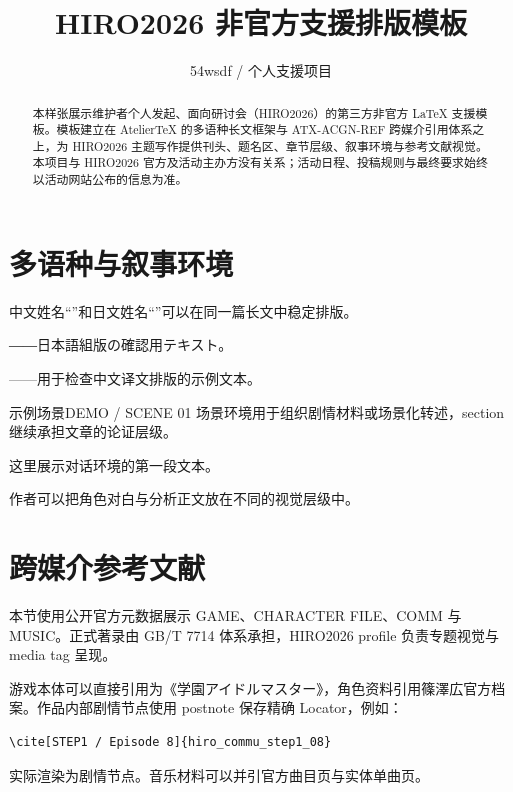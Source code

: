 \documentclass[titlelayout=\HIRODemoTitleLayout]{hiro2026}
\title{HIRO2026 非官方支援排版模板}
\author{54wsdf / 个人支援项目}
\begin{document}
\maketitle

\begin{abstract}
本样张展示维护者个人发起、面向\HiroNameHans{}研讨会（HIRO2026）的第三方非官方 LaTeX 支援模板。模板建立在 AtelierTeX 的多语种长文框架与 ATX-ACGN-REF 跨媒介引用体系之上，为 HIRO2026 主题写作提供刊头、题名区、章节层级、叙事环境与参考文献视觉。本项目与 HIRO2026 官方及活动主办方没有关系；活动日程、投稿规则与最终要求始终以活动网站公布的信息为准。
\end{abstract}

\clearpage

\section{多语种与叙事环境}
中文姓名“\HiroNameHans{}”和日文姓名“\HiroNameJapanese{}”可以在同一篇长文中稳定排版。

\begin{HiroOriginal}[ja]
\HiroNameJapanese{}――日本語組版の確認用テキスト。
\end{HiroOriginal}

\begin{HiroTranslation}
\HiroNameHans{}——用于检查中文译文排版的示例文本。
\end{HiroTranslation}

\begin{HiroScene}{示例场景}{DEMO / SCENE 01}
场景环境用于组织剧情材料或场景化转述，section 继续承担文章的论证层级。
\end{HiroScene}

\begin{HiroDialogue}
这里展示对话环境的第一段文本。

作者可以把角色对白与分析正文放在不同的视觉层级中。
\end{HiroDialogue}

\section{跨媒介参考文献}
本节使用公开官方元数据展示 GAME、CHARACTER FILE、COMM 与 MUSIC。正式著录由 GB/T 7714 体系承担，HIRO2026 profile 负责专题视觉与 media tag 呈现。

游戏本体可以直接引用为《学園アイドルマスター》\cite{gakumas_game}，角色资料引用篠澤広官方档案\cite{hiro_character_file}。作品内部剧情节点使用 postnote 保存精确 Locator，例如：

\begin{verbatim}
\cite[STEP1 / Episode 8]{hiro_commu_step1_08}
\end{verbatim}

实际渲染为剧情节点\cite[STEP1 / Episode 8]{hiro_commu_step1_08}。音乐材料可以并引官方曲目页与实体单曲页\cite{hiro_song_koukei,hiro_1st_single}。

\HIROReferenceLegend
\printbibliography
\end{document}
